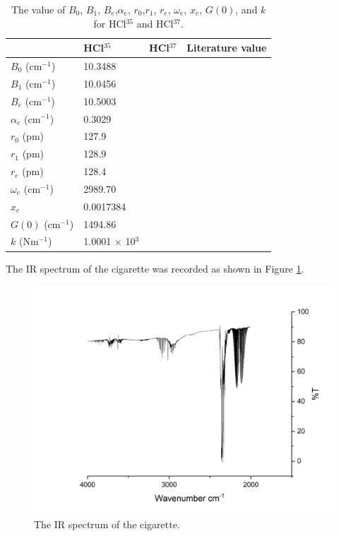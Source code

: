 \documentclass[twocolumn]{article} %
\begin{document}
\begin{table}[h]
    \caption{The value of $B_0$, $B_1$, $B_e$,$\alpha_e$, $r_0$,$r_1$, $r_e$, $\omega_e$, $x_e$, $G(0)$, and $k$ for HCl$^{35}$ and HCl$^{37}$.}
    \begin{tabular}{L{.7in}C{.7in}C{.7in}C{.7in}}\toprule
          & HCl$^{35}$& HCl$^{37} $& Literature value \\\midrule
        $B_0$ (cm$^{-1}$)& 10.3488 &  &\\
        $B_1$ (cm$^{-1}$)& 10.0456 &  &\\
        $B_e$ (cm$^{-1}$)& 10.5003 &  &\\
        $\alpha_e$ (cm$^{-1}$)& 0.3029 &  &\\
        $r_0$ (pm)& 127.9 &  &\\
        $r_1$ (pm)& 128.9 &  &\\
        $r_e$ (pm)& 128.4 &  &\\
        $\omega_e$ (cm$^{-1}$)& 2989.70 &  &\\
        $x_e$ & 0.0017384 &  &\\
        $G(0)$ (cm$^{-1}$)& 1494.86 &  &\\
        $k$ (Nm$^{-1}$)& 1.0001 $\times$ 10$^{3}$ &  &\\\bottomrule
    \end{tabular}
\end{table}

The IR spectrum of the cigarette was recorded as shown in Figure \ref{cigall}.

\begin{figure}[h!]
    \centering
    \includegraphics[width=\columnwidth]{Cig-all.png}
    \caption{The IR spectrum of the cigarette.}
    \label{cigall}
\end{figure}
\end{document}
